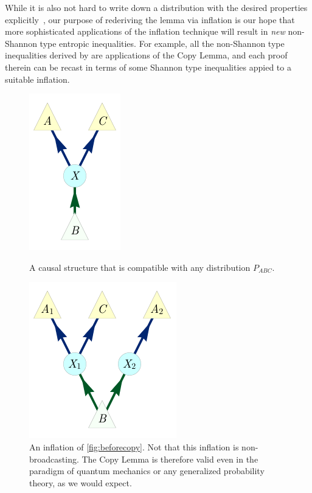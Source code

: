 While it is also not hard to write down a distribution with the desired properties explicitly~\cite[Lemma~15.8]{yeung_network_2008}, our purpose of rederiving the lemma via inflation is our hope that more sophisticated applications of the inflation technique will result in \emph{new} non-Shannon type entropic inequalities. For example, all the non-Shannon type inequalities derived by \citet{zeger_2011_nonshannon} are applications of the Copy Lemma, and each proof therein can be recast in terms of some Shannon type inequalities appied to a suitable inflation.

\begin{figure}[H]
\centering
\begin{minipage}[t]{0.25\linewidth}
\centering
\includegraphics[scale=1]{shannonNOcopyV1.pdf}
\caption{A causal structure that is compatible with any distribution $P_{ABC}$.}\label{fig:beforecopy}
\end{minipage}
\hfill
\begin{minipage}[t]{0.3\linewidth}
\centering
\includegraphics[scale=1]{shannonYEScopyV1.pdf}
\caption{An inflation of \cref{fig:beforecopy}. Not that this inflation is non-broadcasting. The Copy Lemma is therefore valid even in the paradigm of quantum mechanics or any generalized probability theory, as we would expect.}\label{fig:aftercopy}

\end{minipage}
\end{figure}
